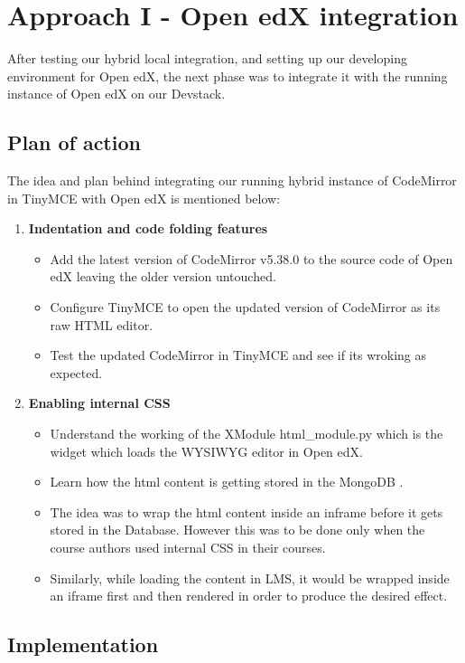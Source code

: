 \chapter{Approach I - Open edX integration}
After testing our hybrid local integration, and setting up our developing environment for Open edX,
the next phase was to integrate it with the running instance of Open edX on our Devstack.
\section{Plan of action}
The idea and plan behind integrating our running hybrid instance of CodeMirror in TinyMCE with
Open edX is mentioned below:
\begin{enumerate}
\item\textbf{Indentation and code folding features}
\begin{itemize}
\item Add the latest version of CodeMirror v5.38.0 to the source code of Open edX
leaving the older version untouched.
\item Configure TinyMCE to open the updated version of CodeMirror as its raw HTML
editor.
\item Test the updated CodeMirror in TinyMCE and see if its wroking as expected.
\end{itemize}
\item\textbf{Enabling internal CSS}
\begin{itemize}
\item Understand the working of the XModule html\_module.py which is the widget
which loads the WYSIWYG editor in Open edX.
\item Learn how the html content is getting stored in the MongoDB .
\item The idea was to wrap the html content inside an inframe before it gets stored in the
Database. However this was to be done only when the course authors used internal
CSS in their courses.
\item Similarly, while loading the content in LMS, it would be wrapped inside an iframe
first and then rendered in order to produce the desired effect.
\end{itemize}
\end{enumerate}

\section{Implementation}
